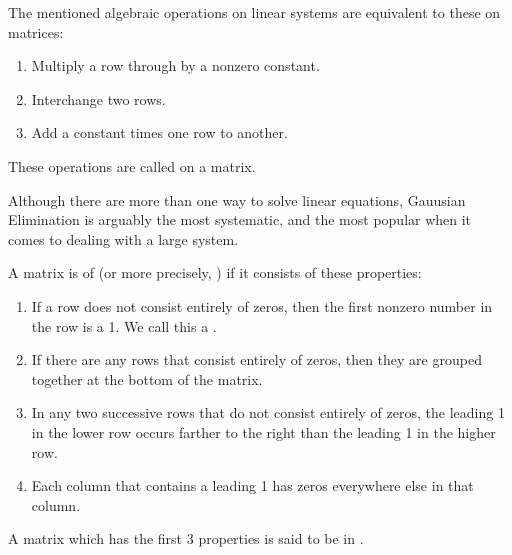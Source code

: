     \par The mentioned algebraic operations on linear systems are 
    equivalent to these on matrices:

    \begin{enumerate}
      \item Multiply a row through by a nonzero constant.
      \item Interchange two rows.
      \item Add a constant times one row to another.
    \end{enumerate}

    \par These operations are called  on a
    matrix.



    \par Although there are more than one way to solve linear equations,
    Gauusian Elimination is arguably the most systematic, and the
    most popular when it comes to dealing with a large system.

    \par A matrix is of  (or more precisely,
    ) if it consists of these properties:
    \begin{enumerate}
      \item If a row does not consist entirely of zeros, then the first
      nonzero number in the row is a 1. We call this a .
      \item If there are any rows that consist entirely of zeros, then
      they are grouped together at the bottom of the matrix.
      \item In any two successive rows that do not consist entirely of
      zeros, the leading 1 in the lower row occurs farther to the right
      than the leading 1 in the higher row.
      \item Each column that contains a leading 1 has zeros everywhere
      else in that column.
    \end{enumerate}
    \par A matrix which has the first 3 properties is said to be in
    .


